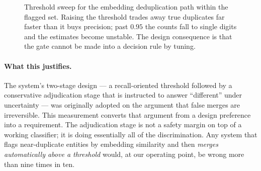 \documentclass[10pt,a4paper]{article}
\begin{document}
\begin{figure}[htbp]
\centering
{}
\caption{Threshold sweep for the embedding deduplication path within the flagged
set. Raising the threshold trades away true duplicates far faster than it buys
precision; past $0.95$ the counts fall to single digits and the estimates become
unstable. The design consequence is that the gate cannot be made into a decision
rule by tuning.}
\label{fig:gate}
\end{figure}

\paragraph{What this justifies.} The system's two-stage design --- a
recall-oriented threshold followed by a conservative adjudication stage that is
instructed to answer ``different'' under uncertainty --- was originally adopted on
the argument that false merges are irreversible. This measurement converts that
argument from a design preference into a requirement. The adjudication stage is
not a safety margin on top of a working classifier; it is doing essentially all
of the discrimination. Any system that flags near-duplicate entities by embedding
similarity and then \emph{merges automatically above a threshold} would, at our
operating point, be wrong more than nine times in ten.
\end{document}

